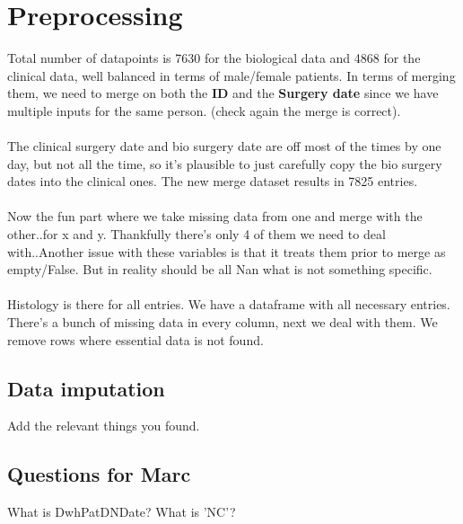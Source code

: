 \documentclass[a4paper]{article}
\begin{document}
\section{Preprocessing}
Total number of datapoints is 7630 for the biological data and 4868 for the clinical data, well balanced in terms of male/female patients. In terms of merging them, we need to merge on both the \textbf{ID} and the \textbf{Surgery date} since we have multiple inputs for the same person. (check again the merge is correct).\\
\\
The clinical surgery date and bio surgery date are off most of the times by one day, but not all the time, so it's plausible to just carefully copy the bio surgery dates into the clinical ones. The new merge dataset results in 7825 entries. \\
\\
Now the fun part where we take missing data from one and merge with the other..for x and y. Thankfully there's only 4 of them we need to deal with..Another issue with these variables is that it treats them prior to merge as empty/False. But in reality should be all Nan what is not something specific. \\
\\ 
Histology is there for all entries. We have a dataframe with all necessary entries. There's a bunch of missing data in every column, next we deal with them. We remove rows where essential data is not found. 
\subsection{Data imputation}
Add the relevant things you found. 
\subsection{Questions for Marc}
What is DwhPatDNDate? What is 'NC'? 
\end{document}
